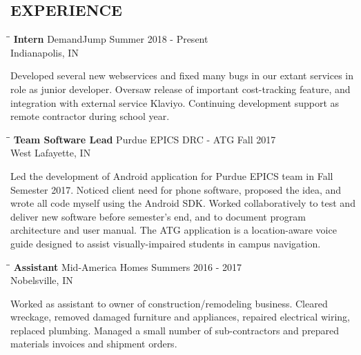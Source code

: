 \documentclass[10pt]{res}
\begin{document}
\begin{resume}
\vspace{-20pt}\section{EXPERIENCE}
   \vspace{-0.1in}	
	\begin{tabbing}
   \hspace{2.3in}\= \hspace{2.6in}\= \kill %
    {\bf Intern} \>DemandJump \>Summer 2018 - Present \\
                             \>Indianapolis, IN
   \end{tabbing}\vspace{-20pt}      %
  Developed several new webservices and fixed many bugs in our extant services in role as junior
  developer. Oversaw release of important cost-tracking feature, and integration with external service
  Klaviyo. Continuing development support as remote contractor during school year.
  \vspace{-10pt}\begin{tabbing}
   \hspace{2.3in}\= \hspace{2.6in}\= \kill %
    {\bf Team Software Lead} \>Purdue EPICS DRC - ATG \>Fall 2017 \\
                             \>West Lafayette, IN
   \end{tabbing}\vspace{-20pt}      %
	Led the development of Android application for Purdue EPICS team in Fall Semester 2017. Noticed client need for phone software, proposed the idea, and wrote all code myself
	using the Android SDK. Worked collaboratively to test and deliver new software before semester's end, and to document program architecture and user manual. The ATG
	application is a location-aware voice guide designed to assist visually-impaired students in campus navigation.
	\vspace{-10pt}\begin{tabbing}
   \hspace{2.3in}\= \hspace{2.6in}\= \kill %
    {\bf Assistant} \>Mid-America Homes \>Summers 2016 - 2017 \\
                             \>Nobelsville, IN
   \end{tabbing}\vspace{-20pt}      %
	Worked as assistant to owner of construction/remodeling business. 
	Cleared wreckage, removed damaged furniture and appliances, repaired electrical wiring, replaced plumbing. 
	Managed a small number of sub-contractors and prepared materials invoices and shipment orders. 
	

\end{resume}
\end{document}
